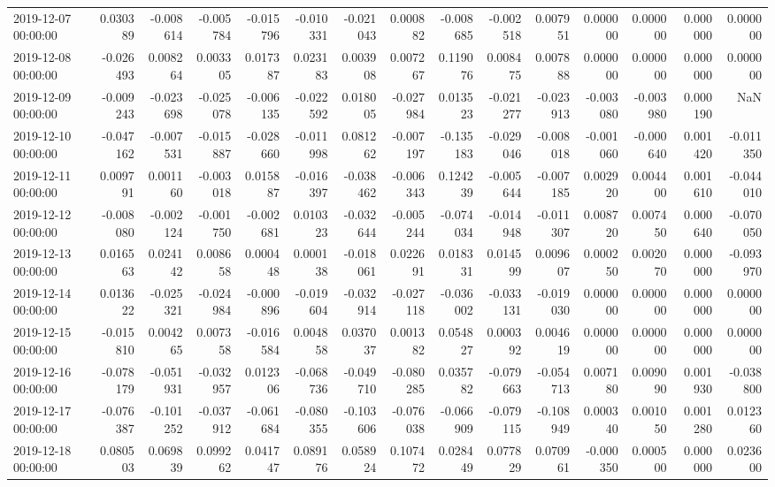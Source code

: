\begin{tabular}{lrrrrrrrrrrrrrr}
2019-12-07 00:00:00 & 0.030389 & -0.008614 & -0.005784 & -0.015796 & -0.010331 & -0.021043 & 0.000882 & -0.008685 & -0.002518 & 0.007951 & 0.000000 & 0.000000 & 0.000000 & 0.000000 \\
2019-12-08 00:00:00 & -0.026493 & 0.008264 & 0.003305 & 0.017387 & 0.023183 & 0.003908 & 0.007267 & 0.119076 & 0.008475 & 0.007888 & 0.000000 & 0.000000 & 0.000000 & 0.000000 \\
2019-12-09 00:00:00 & -0.009243 & -0.023698 & -0.025078 & -0.006135 & -0.022592 & 0.018005 & -0.027984 & 0.013523 & -0.021277 & -0.023913 & -0.003080 & -0.003980 & 0.000190 & NaN \\
2019-12-10 00:00:00 & -0.047162 & -0.007531 & -0.015887 & -0.028660 & -0.011998 & 0.081262 & -0.007197 & -0.135183 & -0.029046 & -0.008018 & -0.001060 & -0.000640 & 0.001420 & -0.011350 \\
2019-12-11 00:00:00 & 0.009791 & 0.001160 & -0.003018 & 0.015887 & -0.016397 & -0.038462 & -0.006343 & 0.124239 & -0.005644 & -0.007185 & 0.002920 & 0.004400 & 0.001610 & -0.044010 \\
2019-12-12 00:00:00 & -0.008080 & -0.002124 & -0.001750 & -0.002681 & 0.010323 & -0.032644 & -0.005244 & -0.074034 & -0.014948 & -0.011307 & 0.008720 & 0.007450 & 0.000640 & -0.070050 \\
2019-12-13 00:00:00 & 0.016563 & 0.024142 & 0.008658 & 0.000448 & 0.000138 & -0.018061 & 0.022691 & 0.018331 & 0.014599 & 0.009607 & 0.000250 & 0.002070 & 0.000000 & -0.093970 \\
2019-12-14 00:00:00 & 0.013622 & -0.025321 & -0.024984 & -0.000896 & -0.019604 & -0.032914 & -0.027118 & -0.036002 & -0.033131 & -0.019030 & 0.000000 & 0.000000 & 0.000000 & 0.000000 \\
2019-12-15 00:00:00 & -0.015810 & 0.004265 & 0.007358 & -0.016584 & 0.004858 & 0.037037 & 0.001382 & 0.054827 & 0.000392 & 0.004619 & 0.000000 & 0.000000 & 0.000000 & 0.000000 \\
2019-12-16 00:00:00 & -0.078179 & -0.051931 & -0.032957 & 0.012306 & -0.068736 & -0.049710 & -0.080285 & 0.035782 & -0.079663 & -0.054713 & 0.007180 & 0.009090 & 0.001930 & -0.038800 \\
2019-12-17 00:00:00 & -0.076387 & -0.101252 & -0.037912 & -0.061684 & -0.080355 & -0.103606 & -0.076038 & -0.066909 & -0.079115 & -0.108949 & 0.000340 & 0.001050 & 0.001280 & 0.012360 \\
2019-12-18 00:00:00 & 0.080503 & 0.069839 & 0.099262 & 0.041747 & 0.089176 & 0.058924 & 0.107472 & 0.028449 & 0.077829 & 0.070961 & -0.000350 & 0.000500 & 0.000000 & 0.023600 \\

\end{tabular}
